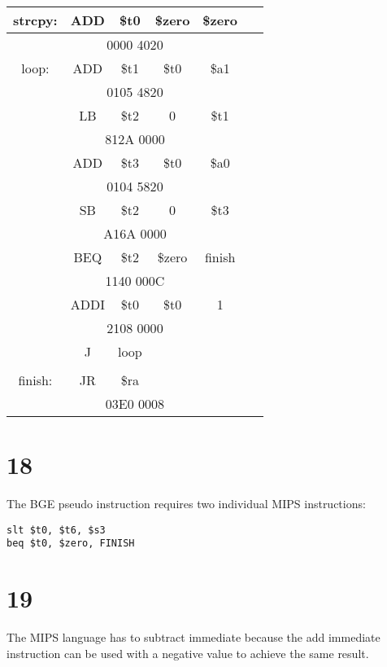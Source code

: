 \documentclass[a4paper,11pt]{article}
\begin{document}
\begin{tabular}{  | c | c | c | c | c | c |  }
  \hline
  strcpy: & ADD & \$t0 & \$zero & \$zero&   \\ \hline
           \multicolumn{6}{|c|}{0000 4020}  \\ \hline
 loop: & ADD & \$t1 & \$t0 & \$a1 &  \\ \hline
         \multicolumn{6}{|c|}{0105 4820} \\ \hline
           & LB & \$t2 & 0 & \$t1 &   \\ \hline
        \multicolumn{6}{|c|}{812A 0000}  \\ \hline
           & ADD & \$t3 & \$t0 & \$a0 & \\ \hline
       \multicolumn{6}{|c|}{0104 5820}  \\ \hline
           & SB & \$t2 & 0 & \$t3 &  \\ \hline
          \multicolumn{6}{|c|}{A16A 0000}  \\ \hline
           & BEQ & \$t2 & \$zero & finish &  \\ \hline
       \multicolumn{6}{|c|}{1140 000C}  \\ \hline
           & ADDI & \$t0 & \$t0 & 1 &  \\ \hline
        \multicolumn{6}{|c|}{2108 0000}  \\ \hline
           & J & loop &  &  &  \\ \hline
       \multicolumn{6}{|c|}{}  \\ \hline
finish: & JR & \$ra &  &  & \  \\ \hline
       \multicolumn{6}{|c|}{03E0 0008}   \\ \hline
\end{tabular}


\section*{18}
The BGE pseudo instruction requires two individual MIPS instructions:
\begin{verbatim}
slt $t0, $t6, $s3
beq $t0, $zero, FINISH 
\end{verbatim}



\section*{19}
The MIPS language has to subtract immediate because the add immediate instruction can be used with a negative value to achieve the same result.  
\end{document}
